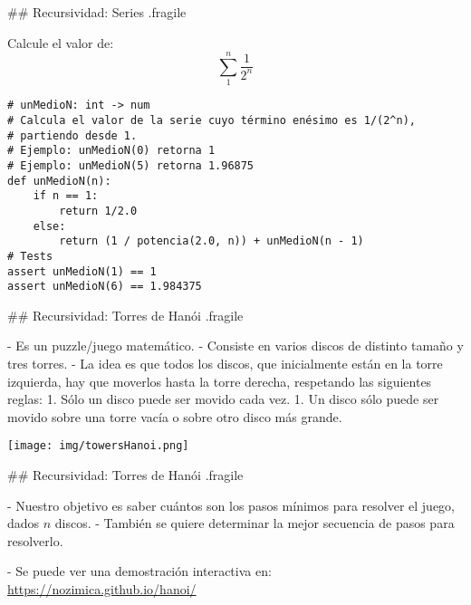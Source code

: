 ## Recursividad: Series {.fragile}

\bgnblockgood
{} Calcule el valor de:
\vspace{-1.5ex}
$$ \sum_{1}^n \frac{1}{2^n} $$
\vspace{-1.5ex}
\trmblockgood

\pause

\begin{lstlisting}[style=frame02]
# unMedioN: int -> num
# Calcula el valor de la serie cuyo término enésimo es 1/(2^n),
# partiendo desde 1.
# Ejemplo: unMedioN(0) retorna 1
# Ejemplo: unMedioN(5) retorna 1.96875
def unMedioN(n):
    if n == 1:
        return 1/2.0
    else:
        return (1 / potencia(2.0, n)) + unMedioN(n - 1)
# Tests
assert unMedioN(1) == 1
assert unMedioN(6) == 1.984375
\end{lstlisting}

## Recursividad: Torres de Hanói {.fragile}

- Es un puzzle/juego matemático.
- Consiste en varios discos de distinto tamaño y tres torres.
- La idea es que todos los discos, que inicialmente están en la torre
izquierda, hay que moverlos hasta la torre derecha, respetando las siguientes reglas:
    1. Sólo un disco puede ser movido cada vez.
    1. Un disco sólo puede ser movido sobre una torre vacía o sobre otro disco más grande.

\centering    \texttt{[image: img/towersHanoi.png]}

## Recursividad: Torres de Hanói {.fragile}

- Nuestro objetivo es saber cuántos son los pasos mínimos para resolver el juego, dados
$n$ discos.
- También se quiere determinar la mejor secuencia de pasos para resolverlo.

- Se puede ver una demostración interactiva en: \url{https://nozimica.github.io/hanoi/}


